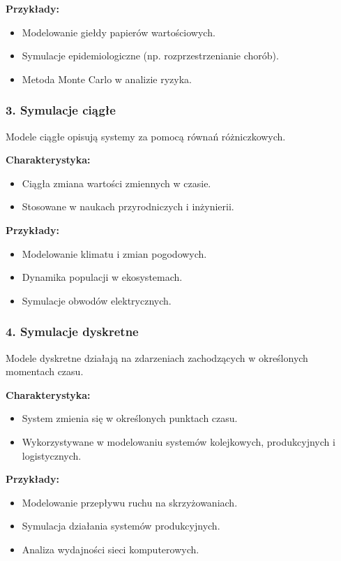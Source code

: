 \textbf{Przykłady:}
\begin{itemize}
    \item Modelowanie giełdy papierów wartościowych.
    \item Symulacje epidemiologiczne (np. rozprzestrzenianie chorób).
    \item Metoda Monte Carlo w analizie ryzyka.
\end{itemize}

\subsubsection{3. Symulacje ciągłe}
Modele ciągłe opisują systemy za pomocą równań różniczkowych.

\textbf{Charakterystyka:}
\begin{itemize}
    \item Ciągła zmiana wartości zmiennych w czasie.
    \item Stosowane w naukach przyrodniczych i inżynierii.
\end{itemize}

\textbf{Przykłady:}
\begin{itemize}
    \item Modelowanie klimatu i zmian pogodowych.
    \item Dynamika populacji w ekosystemach.
    \item Symulacje obwodów elektrycznych.
\end{itemize}

\subsubsection{4. Symulacje dyskretne}
Modele dyskretne działają na zdarzeniach zachodzących w określonych momentach czasu.

\textbf{Charakterystyka:}
\begin{itemize}
    \item System zmienia się w określonych punktach czasu.
    \item Wykorzystywane w modelowaniu systemów kolejkowych, produkcyjnych i logistycznych.
\end{itemize}

\textbf{Przykłady:}
\begin{itemize}
    \item Modelowanie przepływu ruchu na skrzyżowaniach.
    \item Symulacja działania systemów produkcyjnych.
    \item Analiza wydajności sieci komputerowych.
\end{itemize}

